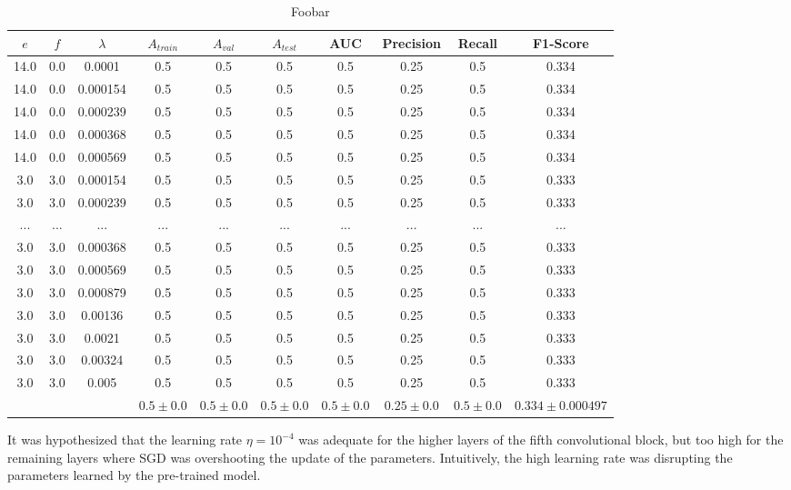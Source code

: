 \begin{table}[ht]
\centering
\begin{tabular}{ |c|c|c|c|c|c|c|c|c|c| }
\hline
$e$ & $f$ & $\lambda$ & $A_{train}$ & $A_{val}$ & $A_{test}$ & AUC & Precision & Recall & F1-Score \\
\hline
14.0 & 0.0 & 0.0001 & 0.5 & 0.5 & 0.5 & 0.5 & 0.25 & 0.5 & 0.334 \\
14.0 & 0.0 & 0.000154 & 0.5 & 0.5 & 0.5 & 0.5 & 0.25 & 0.5 & 0.334 \\
14.0 & 0.0 & 0.000239 & 0.5 & 0.5 & 0.5 & 0.5 & 0.25 & 0.5 & 0.334 \\
14.0 & 0.0 & 0.000368 & 0.5 & 0.5 & 0.5 & 0.5 & 0.25 & 0.5 & 0.334 \\
14.0 & 0.0 & 0.000569 & 0.5 & 0.5 & 0.5 & 0.5 & 0.25 & 0.5 & 0.334 \\
3.0 & 3.0 & 0.000154 & 0.5 & 0.5 & 0.5 & 0.5 & 0.25 & 0.5 & 0.333 \\
3.0 & 3.0 & 0.000239 & 0.5 & 0.5 & 0.5 & 0.5 & 0.25 & 0.5 & 0.333 \\
... & ... & ... & ... & ... & ... & ... & ... & ... & ... \\
3.0 & 3.0 & 0.000368 & 0.5 & 0.5 & 0.5 & 0.5 & 0.25 & 0.5 & 0.333 \\
3.0 & 3.0 & 0.000569 & 0.5 & 0.5 & 0.5 & 0.5 & 0.25 & 0.5 & 0.333 \\
3.0 & 3.0 & 0.000879 & 0.5 & 0.5 & 0.5 & 0.5 & 0.25 & 0.5 & 0.333 \\
3.0 & 3.0 & 0.00136 & 0.5 & 0.5 & 0.5 & 0.5 & 0.25 & 0.5 & 0.333 \\
3.0 & 3.0 & 0.0021 & 0.5 & 0.5 & 0.5 & 0.5 & 0.25 & 0.5 & 0.333 \\
3.0 & 3.0 & 0.00324 & 0.5 & 0.5 & 0.5 & 0.5 & 0.25 & 0.5 & 0.333 \\
3.0 & 3.0 & 0.005 & 0.5 & 0.5 & 0.5 & 0.5 & 0.25 & 0.5 & 0.333 \\
\hline
 & & & $0.5\pm0.0$ & $0.5\pm0.0$ & $0.5\pm0.0$ & $0.5\pm0.0$ & $0.25\pm0.0$ & $0.5\pm0.0$ & $0.334\pm0.000497$ \\
\hline
\end{tabular}
\caption{Foobar}
\label{table:vgg16_partial}
\end{table}

It was hypothesized that the learning rate $\eta = 10^{-4}$ was adequate for the higher layers of the fifth convolutional block, but too high for the remaining layers where \ac{SGD} was overshooting the update of the parameters. Intuitively, the high learning rate was disrupting the parameters learned by the pre-trained model.

